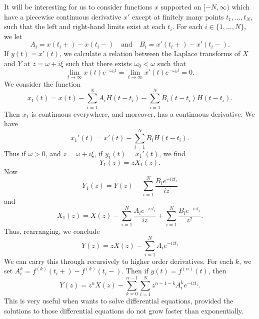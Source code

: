 \begin{remark}
    It will be interesting for us to consider functions $x$ supported on $[-N,\infty)$ which have a piecewise continuous derivative $x'$ except at finitely many points $t_1, \dots, t_N$, such that the left and right-hand limits exist at each $t_i$. For each $i \in \{ 1, \dots, N \}$, we let
    \[ A_i = x(t_i+) - x(t_i-) \quad\text{and}\quad B_i = x'(t_i+) - x'(t_i-). \]
    If $y(t) = x'(t)$, we calculate a relation between the Laplace transforms of $X$ and $Y$ at $z = \omega + i\xi$ such that there exists $\omega_0 < \omega$ such that
    \[ \lim_{t \to \infty} x(t) e^{-\omega_0 t} = \lim_{t \to \infty} x'(t) e^{-\omega_0 t} = 0. \]
    We consider the function
    \[ x_1(t) = x(t) - \sum_{i = 1}^N A_i H(t - t_i) - \sum_{i = 1}^N B_i (t - t_i) H(t - t_i). \] 
    Then $x_1$ is continuous everywhere, and moreover, has a continuous derivative. We have
    \[ x_1'(t) = x'(t) - \sum_{i = 1}^N B_i H(t - t_i). \]
    Thus if $\omega > 0$, and $z = \omega + i \xi$, if $y_1(t) = x_1'(t)$, we find
    \[ Y_1(z) = z X_1(z). \]
    Now
    \[ Y_1(z) = Y(z) - \sum_{i = 1}^N \frac{B_i e^{-i z t_i}}{iz} \]
    and
    \[ X_1(z) = X(z) - \sum_{i = 1}^N \frac{A_i e^{-i z t_i}}{iz} + \sum_{i = 1}^N \frac{B_i e^{-i z t_i}}{z^2}. \]
    Thus, rearranging, we conclude
    \[ Y(z) = z X(z) - \sum_{i = 1}^N A_i e^{-i z t_i} \]
    We can carry this through recursively to higher order derivatives. For each $k$, we set $A^k_i = f^{(k)}(t_i+) - f^{(k)}(t_i-)$. Then if $y(t) = f^{(n)}(t)$, then
    \[ Y(z) = z^n X(z) - \sum_{k = 0}^{n-1} \sum_{i = 1}^N z^{n-1-k} A^k_i e^{-izt_i}. \]
    This is very useful when wants to solve differential equations, provided the solutions to those differential equations do not grow faster than exponentially.
\end{remark}

